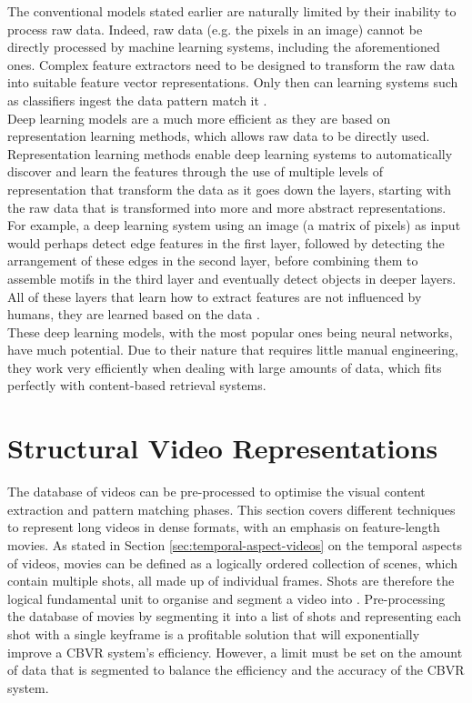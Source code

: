 The conventional models stated earlier are naturally limited by their inability to process raw data. Indeed, raw data (e.g. the pixels in an image) cannot be directly processed by machine learning systems, including the aforementioned ones. Complex feature extractors need to be designed to transform the raw data into suitable feature vector representations. Only then can learning systems such as classifiers ingest the data pattern match it \cite{lecun2015deeplearning}.\\

Deep learning models are a much more efficient as they are based on representation learning methods, which allows raw data to be directly used. Representation learning methods enable deep learning systems to automatically discover and learn the features through the use of multiple levels of representation that transform the data as it goes down the layers, starting with the raw data that is transformed into more and more abstract representations. For example, a deep learning system using an image (a matrix of pixels) as input would perhaps detect edge features in the first layer, followed by detecting the arrangement of these edges in the second layer, before combining them to assemble motifs in the third layer and eventually detect objects in deeper layers. All of these layers that learn how to extract features are not influenced by humans, they are learned based on the data \cite{lecun2015deeplearning}.\\

These deep learning models, with the most popular ones being neural networks, have much potential. Due to their nature that requires little manual engineering, they work very efficiently when dealing with large amounts of data, which fits perfectly with content-based retrieval systems.

\section{Structural Video Representations}
\label{sec:movie-pre-processing}

The database of videos can be pre-processed to optimise the visual content extraction and pattern matching phases. This section covers different techniques to represent long videos in dense formats, with an emphasis on feature-length movies. As stated in Section \ref{sec:temporal-aspect-videos} on the temporal aspects of videos, movies can be defined as a logically ordered collection of scenes, which contain multiple shots, all made up of individual frames. Shots are therefore the logical fundamental unit to organise and segment a video into \cite{hu2011survey}. Pre-processing the database of movies by segmenting it into a list of shots and representing each shot with a single keyframe is a profitable solution that will exponentially improve a CBVR system's efficiency. However, a limit must be set on the amount of data that is segmented to balance the efficiency and the accuracy of the CBVR system.

